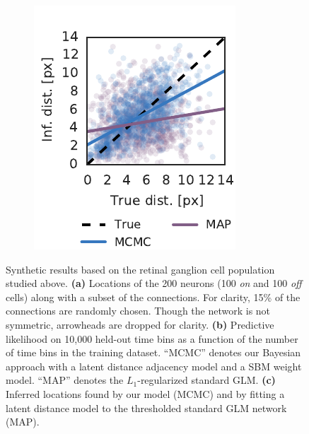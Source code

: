 \begin{figure}[t!]
\begin{subfigure}[b]{1.8in}
    \includegraphics[width=\textwidth]{figures/ch3/synth_rgc_pairwise_distance_scatter.pdf}
    \label{fig:synth_rgc_pairwise_dists}
  \end{subfigure}
  \caption[Synthetic RGC results]{Synthetic results based on the
    retinal ganglion cell population studied above.
    \textbf{(a)} Locations of the 200 neurons (100 \textit{on} and 100 \textit{off} cells) along with a subset of the connections. For clarity, 15\% of the connections are randomly chosen. Though the network is not symmetric, arrowheads are dropped for clarity.
    \textbf{(b)} Predictive likelihood on 10,000 held-out time bins as a function of the number of time bins in the training dataset. ``MCMC'' denotes our Bayesian approach with a latent distance adjacency model and a SBM weight model. ``MAP'' denotes the $L_1$-regularized standard GLM.
    \textbf{(c)} Inferred locations found by our model (MCMC) and by fitting a latent distance model to the thresholded standard GLM network (MAP).
  }
  \label{fig:synth_rgc}
\end{figure}


